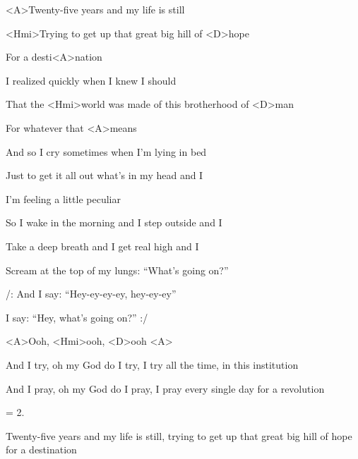 
\zs
<A>Twenty-five years and my life is still

<Hmi>Trying to get up that great big hill of <D>hope

For a desti<A>nation

I realized quickly when I knew I should

That the <Hmi>world was made of this brotherhood of <D>man

For whatever that <A>means
\ks

\zs
And so I cry sometimes when I'm lying in bed

Just to get it all out what's in my head and I

I'm feeling a little peculiar

So I wake in the morning and I step outside and I

Take a deep breath and I get real high and I

Scream at the top of my lungs: ``What's going on?''
\ks

\zr
/: And I say: ``Hey-ey-ey-ey, hey-ey-ey''

I say: ``Hey, what's going on?'' :/
\kr

<A>Ooh, <Hmi>ooh, <D>ooh <A>

\zs
And I try, oh my God do I try, I try all the time, in this institution

And I pray, oh my God do I pray, I pray every single day for a revolution
\ks

\zs 
= 2.
\ks

\zr
\kr

\zs
Twenty-five years and my life is still, trying to get up that great big hill 
of hope for a destination
\ks

\kp
